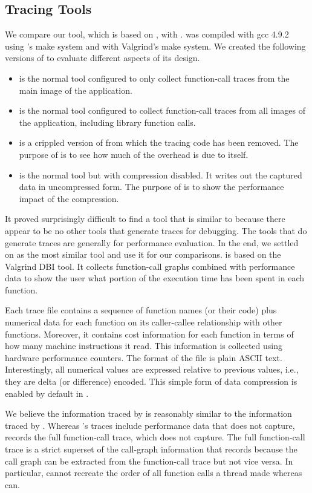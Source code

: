 \subsection{Tracing Tools}
\label{sec:tracing-tools}

We compare our \parlot tool, which is based on , with . \parlot was compiled with gcc 4.9.2 using \pin 's make system and \callgrind with Valgrind's make system. We created the following versions of \parlot to evaluate different aspects of its design.

\begin{itemize}
\item \textbf{\parlotm} is the normal \parlot tool configured to only collect function-call traces from the main image of the application.
\item \textbf{\parlota} is the normal \parlot tool configured to collect function-call traces from all images of the application, including library function calls.
\item \textbf{\pininit} is a crippled version of \parlot from which the tracing code has been removed. The purpose of \pininit is to see how much of the overhead is due to \pin itself.
\item \textbf{\parlotnc} is the normal \parlot tool but with compression disabled. It writes out the captured data in uncompressed form. The purpose of \parlotnc is to show the performance impact of the compression.
\end{itemize}


It proved surprisingly difficult to find a tool that is similar to \parlot because there appear to be no other tools that generate traces for debugging. The tools that do generate traces are generally for performance evaluation. In the end, we settled on \callgrind as the most similar tool and use it for our comparisons. \callgrind is based on the Valgrind DBI tool. It collects function-call graphs combined with performance data to show the user what portion of the execution time has been spent in each function.

Each \callgrind trace file contains a sequence of function names (or their code) plus numerical data for each function on its caller-callee relationship with other functions. Moreover, it contains cost information for each function in terms of how many machine instructions it read. This information is collected using hardware performance counters. The format of the file is plain ASCII text. Interestingly, all numerical values are expressed relative to previous values, i.e., they are delta (or difference) encoded. This simple form of data compression is enabled by default in \callgrind.

We believe the information traced by \callgrind is reasonably similar to the information traced by \parlotm. Whereas \callgrind 's traces include performance data that \parlot does not capture, \parlot records the full function-call trace, which \callgrind does not capture. The full function-call trace is a strict superset of the call-graph information that \callgrind records because the call graph can be extracted from the function-call trace but not vice versa. In particular, \callgrind cannot recreate the order of all function calls a thread made whereas \parlot can.

